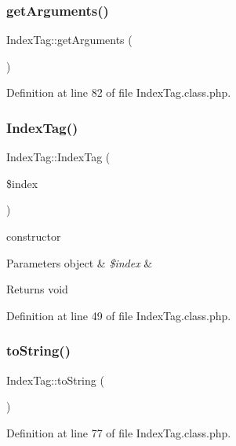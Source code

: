\subsubsection{\texorpdfstring{get\+Arguments()}{getArguments()}}
{\footnotesize\ttfamily Index\+Tag\+::get\+Arguments (\begin{DoxyParamCaption}{ }\end{DoxyParamCaption})}



Definition at line 82 of file Index\+Tag.\+class.\+php.

\hypertarget{classIndexTag_ad5fcf85307fcc38d75fc1df63ba2b19f}{}\label{classIndexTag_ad5fcf85307fcc38d75fc1df63ba2b19f} 
\subsubsection{\texorpdfstring{Index\+Tag()}{IndexTag()}}
{\footnotesize\ttfamily Index\+Tag\+::\+Index\+Tag (\begin{DoxyParamCaption}\item[{}]{\$index }\end{DoxyParamCaption})}

constructor 
\begin{DoxyParams}[1]{Parameters}
object & {\em \$index} & \\
\hline
\end{DoxyParams}
\begin{DoxyReturn}{Returns}
void 
\end{DoxyReturn}


Definition at line 49 of file Index\+Tag.\+class.\+php.

\hypertarget{classIndexTag_a2ba180bac75a74b01c98c1494fc63b60}{}\label{classIndexTag_a2ba180bac75a74b01c98c1494fc63b60} 
\subsubsection{\texorpdfstring{to\+String()}{toString()}}
{\footnotesize\ttfamily Index\+Tag\+::to\+String (\begin{DoxyParamCaption}{ }\end{DoxyParamCaption})}



Definition at line 77 of file Index\+Tag.\+class.\+php.



